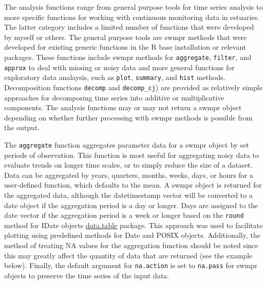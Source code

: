 \documentclass[10pt,letterpaper]{article}\usepackage[]{graphicx}\usepackage[]{color}
\begin{document}
The analysis functions range from general purpose tools for time series analysis to more specific functions for working with continuous monitoring data in estuaries.  The latter category includes a limited number of functions that were developed by myself or others.  The general purpose tools are swmpr methods that were developed for existing generic functions in the R base installation or relevant packages.  These functions include swmpr methods for \texttt{aggregate}, \texttt{filter}, and \texttt{approx} to deal with missing or noisy data and more general functions for exploratory data analaysis, such as \texttt{plot}, \texttt{summary}, and \texttt{hist} methods.  Decomposition functions \texttt{decomp} and \texttt{decomp\_cj}) are provided as relatively simple approaches for decomposing time series into additive or multiplicative components. The analysis functions may or may not return a swmpr object depending on whether further processing with swmpr methods is possible from the output.    

The \texttt{aggregate} function aggregates parameter data for a swmpr object by set periods of observation.  This function is most useful for aggregating noisy data to evaluate trends on longer time scales, or to simply reduce the size of a dataset.  Data can be aggregated by years, quarters, months, weeks, days, or hours for a user-defined function, which defaults to the mean.  A swmpr object is returned for the aggregated data, although the datetimestamp vector will be converted to a date object if the aggregation period is a day or longer.  Days are assigned to the date vector if the aggregation period is a week or longer based on the \texttt{round} method for IDate objects \href{http://cran.r-project.org/web/packages/data.table/index.html}{data.table} package.  This approach was used to facilitate plotting using predefined methods for Date and POSIX objects.  Additionally, the method of treating NA values for the aggregation function should be noted since this may greatly affect the quantity of data that are returned (see the example below).  Finally, the default argument for \texttt{na.action} is set to \texttt{na.pass} for swmpr objects to preserve the time series of the input data.
\end{document}
